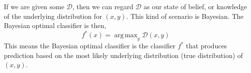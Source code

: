 \documentclass[12pt]{article}
\theoremstyle{definition}
\DeclareMathOperator*{\argmax}{arg\,max}
\begin{document}
If we are given some $\mathcal{D}$, then we can regard $\mathcal{D}$ as our state of belief, or knowledge of the underlying distribution for $(x,y)$. This kind of scenario is Bayesian. The Bayesian optimal classifier is then,
\begin{equation}
  f^*(x)=\argmax_y\mathcal{D}(x,y)
\end{equation}
This means the Bayesian optimal classifier is the classifier $f^*$ that produces prediction based on the most likely underlying distribution (true distribution) of $(x,y)$.












\end{document}
